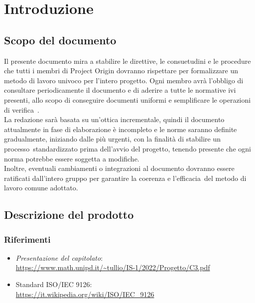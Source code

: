 \section{Introduzione}

\subsection{Scopo del documento}
Il presente documento mira a stabilire le direttive, le consuetudini e le procedure che tutti i membri di Project Origin dovranno rispettare per formalizzare un metodo di lavoro 
univoco per l'intero progetto. Ogni membro avrà l'obbligo di consultare periodicamente il documento e di aderire a tutte le normative ivi presenti, allo scopo di conseguire 
documenti uniformi e semplificare le operazioni di verifica\glo\ . \\ La redazione sarà basata su un'ottica incrementale, quindi il documento attualmente in fase di elaborazione è 
incompleto e le norme saranno definite gradualmente, iniziando dalle più urgenti, con la finalità di stabilire un processo\glo\ standardizzato prima dell'avvio del progetto, 
tenendo presente che ogni norma potrebbe essere soggetta a modifiche. \\ Inoltre, eventuali cambiamenti o integrazioni al documento dovranno essere ratificati dall’intero 
gruppo per garantire la coerenza e l'efficacia\glo\ del metodo di lavoro comune adottato.


\subsection{Descrizione del prodotto}

\subsubsection{Riferimenti}
\begin{itemize}
    \item \textit{Presentazione del capitolato}: \\ \url{https://www.math.unipd.it/~tullio/IS-1/2022/Progetto/C3.pdf}
    \item Standard ISO/IEC 9126\glo: \\ \url{https://it.wikipedia.org/wiki/ISO/IEC_9126}  
\end{itemize}